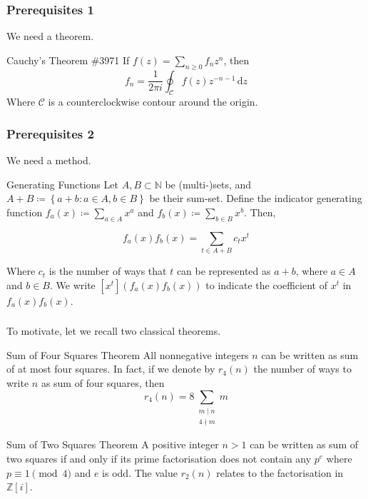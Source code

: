 
\begin{frame}\frametitle{Prerequisites 1}
We need a theorem.
\begin{exampleblock}{Cauchy's Theorem \#3971}
  If \(f(z) = \sum_{n \geq 0} f_n z^n\), then
\[
  f_n = \frac{1}{2\pi i} \oint_{\mathcal{C}} f(z) z^{-n - 1} \, \mathrm{d}z
\]
Where \(\mathcal{C}\) is a counterclockwise contour around the origin.
\end{exampleblock}
\end{frame}

\begin{frame}\frametitle{Prerequisites 2}
We need a method.
\begin{exampleblock}{Generating Functions}
  Let \(A, B \subset \mathbb{N}\) be (multi-)sets, and \(A + B \coloneqq \left\{a + b : a \in A, b \in B\right\}\) be their sum-set. Define the indicator generating function \(f_a(x) \coloneqq \sum_{a \in A} x^a\) and \(f_b(x) \coloneqq \sum_{b \in B} x^b\). Then,

\[
  f_a(x)f_b(x) = \sum_{t \in A + B} c_t x^t
\]

Where \(c_t\) is the number of ways that \(t\) can be represented as \(a + b\), where \(a \in A\) and \(b \in B\). We write \([x^t]\left(f_a(x)f_b(x)\right)\) to indicate the coefficient of \(x^t\) in \(f_a(x)f_b(x)\).
\end{exampleblock}
\end{frame}

\begin{frame}\frametitle{\insertsubsection}
To motivate, let we recall two classical theorems.

\begin{exampleblock}{Sum of Four Squares Theorem}
  All nonnegative integers \(n\) can be written as sum of at most four squares. In fact, if we denote by \(r_4(n)\) the number of ways to write \(n\) as sum of four squares, then
\[
  r_4(n) = 8\sum_{\substack{m \mid n \\ 4 \nmid m}} m
\]
\end{exampleblock}

\begin{exampleblock}{Sum of Two Squares Theorem}
  A positive integer \(n > 1\) can be written as sum of two squares if and only if its prime factorisation does not contain any \(p^e\) where \(p \equiv 1 \pmod{4}\) and \(e\) is odd. The value \(r_2(n)\) relates to the factorisation in \(\mathbb{Z}[i]\).
\end{exampleblock}
\end{frame}

